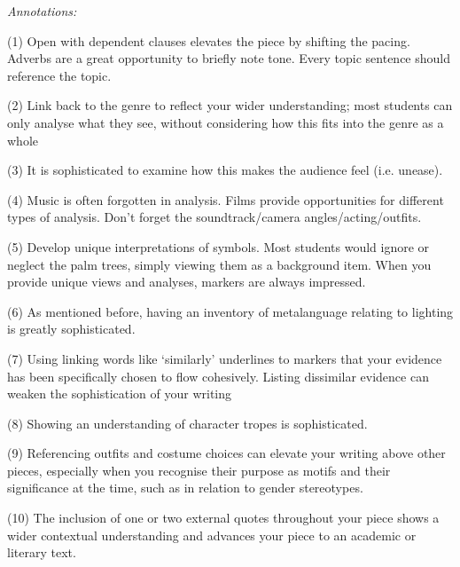 \documentclass[a4paper]{article}
\begin{document}
\textit{Annotations:}

(1) Open with dependent clauses elevates the piece by shifting the pacing. Adverbs are a great opportunity to briefly note tone. Every topic sentence should reference the topic.

(2) Link back to the genre to reflect your wider understanding; most students can only analyse what they see, without considering how this fits into the genre as a whole

(3) It is sophisticated to examine how this makes the audience feel (i.e. unease).

(4) Music is often forgotten in analysis. Films provide opportunities for different types of analysis. Don’t forget the soundtrack/camera angles/acting/outfits.

(5) Develop unique interpretations of symbols. Most students would ignore or neglect the palm trees, simply viewing them as a background item. When you provide unique views and analyses, markers are always impressed.

(6) As mentioned before, having an inventory of metalanguage relating to lighting is greatly sophisticated.

(7) Using linking words like ‘similarly’ underlines to markers that your evidence has been specifically chosen to flow cohesively. Listing dissimilar evidence can weaken the sophistication of your writing

(8) Showing an understanding of character tropes is sophisticated.

(9) Referencing outfits and costume choices can elevate your writing above other pieces, especially when you recognise their purpose as motifs and their significance at the time, such as in relation to gender stereotypes.

(10) The inclusion of one or two external quotes throughout your piece shows a wider contextual understanding and advances your piece to an academic or literary text.\\
\end{document}
